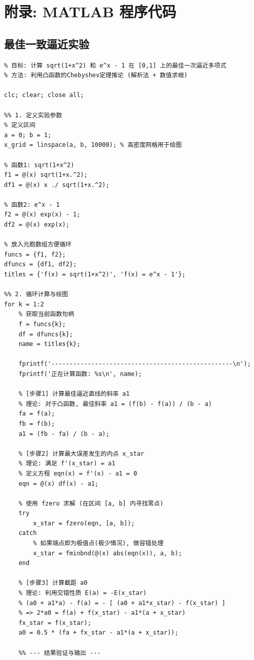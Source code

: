 \documentclass[UTF8, a4paper, 11pt]{ctexart}
\begin{document}
\newpage
\appendix
\section{附录: MATLAB 程序代码}
\subsection{最佳一致逼近实验}
\begin{lstlisting}[caption={两个凸函数的最佳一致逼近计算与拟合效果}]
%% 文件名称: bestapproximation.m
% 目标: 计算 sqrt(1+x^2) 和 e^x - 1 在 [0,1] 上的最佳一次逼近多项式
% 方法: 利用凸函数的Chebyshev定理推论 (解析法 + 数值求根)

clc; clear; close all;

%% 1. 定义实验参数
% 定义区间
a = 0; b = 1;
x_grid = linspace(a, b, 10000); % 高密度网格用于绘图

% 函数1: sqrt(1+x^2)
f1 = @(x) sqrt(1+x.^2);
df1 = @(x) x ./ sqrt(1+x.^2); 

% 函数2: e^x - 1
f2 = @(x) exp(x) - 1;
df2 = @(x) exp(x);

% 放入元胞数组方便循环
funcs = {f1, f2};
dfuncs = {df1, df2};
titles = {'f(x) = sqrt(1+x^2)', 'f(x) = e^x - 1'};

%% 2. 循环计算与绘图
for k = 1:2
    % 获取当前函数句柄
    f = funcs{k};
    df = dfuncs{k};
    name = titles{k};
    
    fprintf('--------------------------------------------------\n');
    fprintf('正在计算函数: %s\n', name);
    
    % [步骤1] 计算最佳逼近直线的斜率 a1
    % 理论: 对于凸函数, 最佳斜率 a1 = (f(b) - f(a)) / (b - a)
    fa = f(a);
    fb = f(b);
    a1 = (fb - fa) / (b - a);
    
    % [步骤2] 计算最大误差发生的内点 x_star
    % 理论: 满足 f'(x_star) = a1
    % 定义方程 eqn(x) = f'(x) - a1 = 0
    eqn = @(x) df(x) - a1;
    
    % 使用 fzero 求解 (在区间 [a, b] 内寻找零点)
    try
        x_star = fzero(eqn, [a, b]); 
    catch
        % 如果端点即为极值点(极少情况), 做容错处理
        x_star = fminbnd(@(x) abs(eqn(x)), a, b);
    end
    
    % [步骤3] 计算截距 a0
    % 理论: 利用交错性质 E(a) = -E(x_star)
    % (a0 + a1*a) - f(a) = - [ (a0 + a1*x_star) - f(x_star) ]
    % => 2*a0 = f(a) + f(x_star) - a1*(a + x_star)
    fx_star = f(x_star);
    a0 = 0.5 * (fa + fx_star - a1*(a + x_star));
    
    %% --- 结果验证与输出 ---
    

\end{lstlisting}
\end{document}
